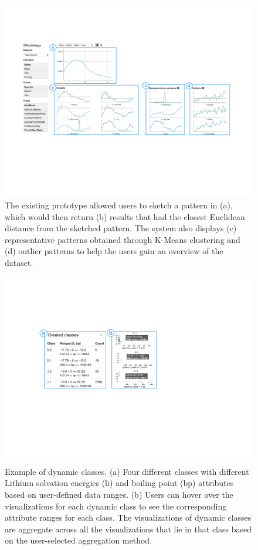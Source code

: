 \begin{figure}[h!]
	\centering
	\includegraphics[width=0.9\linewidth]{figures/oldZV_nozql.pdf}
	\caption{The existing \zv prototype allowed users to sketch a pattern in (a), which would then return (b) results that had the closest Euclidean distance from the sketched pattern. The system also displays (c) representative patterns obtained through K-Means clustering and (d) outlier patterns to help the users gain an overview of the dataset.}
	\label{oldZV}
\end{figure}
\begin{figure}[h!]
  \centering
  \includegraphics[width=0.9\linewidth]{figures/dcc.pdf}
  \vspace{-6pt}
  \caption{Example of dynamic classes. (a) Four different classes with different Lithium solvation energies (li) and boiling point (bp) attributes based on user-defined data ranges. (b) Users can hover over the visualizations for each dynamic class to see the corresponding attribute ranges for each class. The visualizations of dynamic classes are aggregate across all the visualizations that lie in that class based on the user-selected aggregation method.}
  \label{dcc}
  \vspace{-10pt}
\end{figure}
